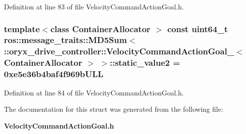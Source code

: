 \-Definition at line 83 of file \-Velocity\-Command\-Action\-Goal.\-h.

\subsubsection[{static\-\_\-value2}]{\setlength{\rightskip}{0pt plus 5cm}template$<$class Container\-Allocator $>$ const uint64\-\_\-t ros\-::message\-\_\-traits\-::\-M\-D5\-Sum$<$ \-::{\bf oryx\-\_\-drive\-\_\-controller\-::\-Velocity\-Command\-Action\-Goal\-\_\-}$<$ \-Container\-Allocator $>$ $>$\-::{\bf static\-\_\-value2} = 0xe5e36b4baf4f969b\-U\-L\-L\hspace{0.3cm}{\ttfamily  [static]}}\label{structros_1_1message__traits_1_1MD5Sum_3_01_1_1oryx__drive__controller_1_1VelocityCommandActionG1d04f26da469addc2ff03febc046aac0_a1b506a46a29e43751fffaf8c9b27f90b}


\-Definition at line 84 of file \-Velocity\-Command\-Action\-Goal.\-h.



\-The documentation for this struct was generated from the following file\-:\begin{DoxyCompactItemize}
\item 
{\bf \-Velocity\-Command\-Action\-Goal.\-h}\end{DoxyCompactItemize}
